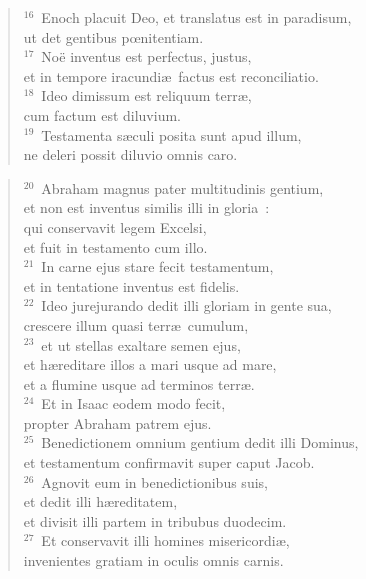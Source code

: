 \begin{verse}${}^{16}$~Enoch placuit Deo, et translatus est in paradisum,\\ ut det gentibus pœnitentiam.\\
${}^{17}$~No\"e inventus est perfectus, justus,\\ et in tempore iracundi\ae\ factus est reconciliatio.\\
${}^{18}$~Ideo dimissum est reliquum terr\ae ,\\ cum factum est diluvium.\\
${}^{19}$~Testamenta s\ae culi posita sunt apud illum,\\ ne deleri possit diluvio omnis caro.\end{verse}


\begin{verse}${}^{20}$~Abraham magnus pater multitudinis gentium,\\ et non est inventus similis illi in gloria~:\\ qui conservavit legem Excelsi,\\ et fuit in testamento cum illo.\\
${}^{21}$~In carne ejus stare fecit testamentum,\\ et in tentatione inventus est fidelis.\\
${}^{22}$~Ideo jurejurando dedit illi gloriam in gente sua,\\ crescere illum quasi terr\ae\ cumulum,\\
${}^{23}$~et ut stellas exaltare semen ejus,\\ et h\ae reditare illos a mari usque ad mare,\\ et a flumine usque ad terminos terr\ae .\\
${}^{24}$~Et in Isaac eodem modo fecit,\\ propter Abraham patrem ejus.\\
${}^{25}$~Benedictionem omnium gentium dedit illi Dominus,\\ et testamentum confirmavit super caput Jacob.\\
${}^{26}$~Agnovit eum in benedictionibus suis,\\ et dedit illi h\ae reditatem,\\ et divisit illi partem in tribubus duodecim.\\
${}^{27}$~Et conservavit illi homines misericordi\ae ,\\ invenientes gratiam in oculis omnis carnis.\end{verse}


